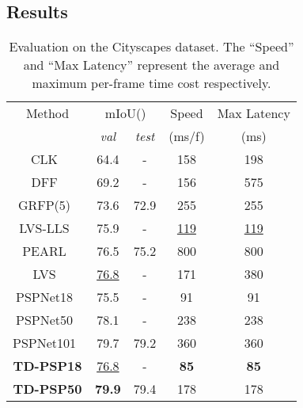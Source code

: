 \documentclass[10pt,twocolumn,letterpaper]{article}
\begin{document}
\subsection{Results}
\begin{table}
\centering
\begin{tabular}{ |c|cc|c|c|} 
\hline
Method             &\multicolumn{2}{c|}{mIoU()}       &Speed &Max Latency \\
                     &\textit{val} &\textit{test}    &(ms/f)   &(ms) \\
 \hline 
 \hline 
 \small{CLK~\cite{shelhamer2016clockwork} }             &64.4 &-    &158 &198\\ 
 \small{DFF~\cite{zhu2017deep}}                         &69.2 &-    &156 &575\\ 
 \small{GRFP(5)~\cite{nilsson2018semantic}}             &73.6 &72.9 &255 &255\\ 
 \small{LVS-LLS~\cite{li2018low}}                       &75.9 &-    &\underline{119} &\underline{119}\\
 \small{PEARL~\cite{jin2017video}}                      &76.5 &75.2 &800 &800 \\ 
 \small{LVS~\cite{li2018low}}                           &\underline{76.8} &-    &171 &380\\  
 \hline
 \small{PSPNet18~\cite{zhao2017pyramid}}                  &75.5 &-    &91  &91    \\
 \small{PSPNet50~\cite{zhao2017pyramid}}                  &78.1 &-    &238 &238   \\ 
 \small{PSPNet101~\cite{zhao2017pyramid}}                 &79.7 &79.2 &360 &360   \\ 
 \hline 
 \small{\textbf{TD-PSP18}}                             &\underline{76.8} &- &\textbf{85}  &\textbf{85}    \\ 
 \small{\textbf{TD-PSP50}}  &\textbf{79.9} &79.4 &178 &178   \\ 
 \hline 
\end{tabular}
\vspace{0.1cm}
\caption{\small{Evaluation on the Cityscapes dataset. The ``Speed'' and ``Max Latency'' represent the average and maximum per-frame time cost respectively.}}
\label{tab1}
\vspace{-0.5cm}
\end{table}
\end{document}
